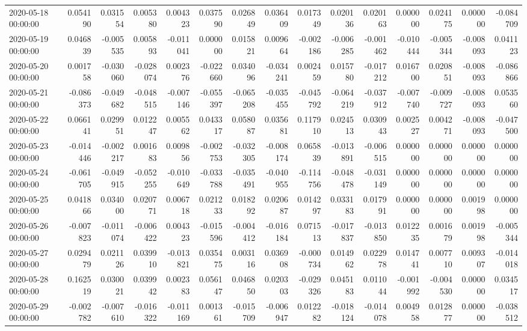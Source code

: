 \begin{tabular}{lrrrrrrrrrrrrrr}
2020-05-18 00:00:00 & 0.054190 & 0.031554 & 0.005380 & 0.004323 & 0.037590 & 0.026849 & 0.036409 & 0.017349 & 0.020136 & 0.020163 & 0.000000 & 0.024175 & 0.000000 & -0.084709 \\
2020-05-19 00:00:00 & 0.046839 & -0.005535 & 0.005893 & -0.011041 & 0.000000 & 0.015821 & 0.009664 & -0.002186 & -0.006285 & -0.001462 & -0.010444 & -0.005344 & -0.008093 & 0.041123 \\
2020-05-20 00:00:00 & 0.001758 & -0.030060 & -0.028074 & 0.002376 & -0.022660 & 0.034096 & -0.034241 & 0.002459 & 0.015780 & -0.017212 & 0.016700 & 0.020851 & -0.008093 & -0.086866 \\
2020-05-21 00:00:00 & -0.086373 & -0.049682 & -0.048515 & -0.007146 & -0.055397 & -0.065208 & -0.035455 & -0.045792 & -0.064219 & -0.037912 & -0.007740 & -0.009727 & -0.008093 & 0.053560 \\
2020-05-22 00:00:00 & 0.066141 & 0.029951 & 0.012247 & 0.005562 & 0.043317 & 0.058087 & 0.035681 & 0.117910 & 0.024513 & 0.030943 & 0.002527 & 0.004271 & -0.008093 & -0.047500 \\
2020-05-23 00:00:00 & -0.014446 & -0.002217 & 0.001683 & 0.009856 & -0.002753 & -0.032305 & -0.008174 & 0.065839 & -0.013891 & -0.006515 & 0.000000 & 0.000000 & 0.000000 & 0.000000 \\
2020-05-24 00:00:00 & -0.061705 & -0.049915 & -0.052255 & -0.010649 & -0.033788 & -0.035491 & -0.040955 & -0.114756 & -0.048478 & -0.031149 & 0.000000 & 0.000000 & 0.000000 & 0.000000 \\
2020-05-25 00:00:00 & 0.041866 & 0.034000 & 0.020771 & 0.006718 & 0.021233 & 0.018292 & 0.020687 & 0.014297 & 0.033183 & 0.017991 & 0.000000 & 0.000000 & 0.001998 & 0.000000 \\
2020-05-26 00:00:00 & -0.007823 & -0.011074 & -0.006422 & 0.004323 & -0.015596 & -0.004412 & -0.016184 & 0.071513 & -0.017837 & -0.013850 & 0.012235 & 0.001679 & 0.001998 & -0.005344 \\
2020-05-27 00:00:00 & 0.029479 & 0.021126 & 0.039910 & -0.013821 & 0.035475 & 0.003116 & 0.036908 & -0.000734 & 0.014962 & 0.022978 & 0.014741 & 0.007710 & 0.009307 & -0.014018 \\
2020-05-28 00:00:00 & 0.162519 & 0.030021 & 0.039942 & 0.002383 & 0.056147 & 0.046850 & 0.020303 & -0.029326 & 0.045183 & 0.011044 & -0.001992 & -0.004530 & 0.000000 & 0.034517 \\
2020-05-29 00:00:00 & -0.002782 & -0.007610 & -0.016322 & -0.011169 & 0.001361 & -0.015709 & -0.006947 & 0.012282 & -0.018124 & -0.014078 & 0.004958 & 0.012877 & 0.000000 & -0.038512 \\

\end{tabular}
